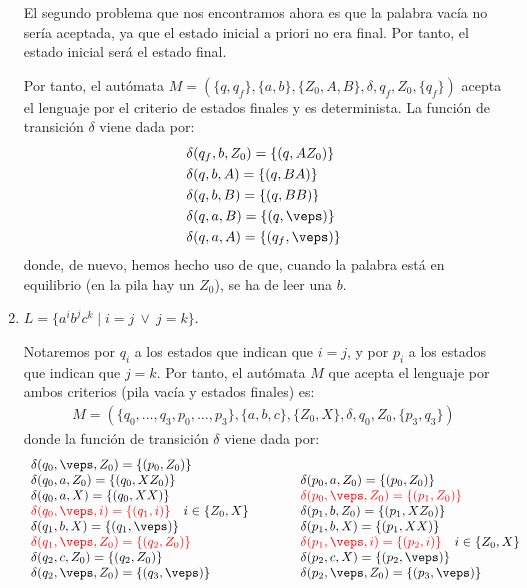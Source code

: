 \begin{ejercicio}
\begin{enumerate}
        El segundo problema que nos encontramos ahora es que la palabra vacía no sería aceptada, ya que el estado inicial a priori no era final. Por tanto, el estado inicial será el estado final.

        Por tanto, el autómata $M = (\{q, q_f\},\{a,b\},\{Z_0,A,B\},\delta,q_{f},Z_0,\{q_f\})$ acepta el lenguaje por el criterio de estados finales y es determinista. La función de transición $\delta$ viene dada por:
        \begin{align*}
            &\delta(q_{f},b,Z_0) = \{(q,AZ_0)\} \\
            &\delta(q,b,A) = \{(q,BA)\} \\
            &\delta(q,b,B) = \{(q,BB)\} \\
            &\delta(q,a,B) = \{(q,\veps)\} \\
            &\delta(q,a,A) = \{(q_f,\veps)\}
        \end{align*}
        donde, de nuevo, hemos hecho uso de que, cuando la palabra está en equilibrio (en la pila hay un $Z_0$), se ha de leer una $b$.
        \item $L = \{a^i b^j c^k \mid i=j\ \lor\ j = k\}$.
        
        Notaremos por $q_i$ a los estados que indican que $i=j$, y por $p_i$ a los estados que indican que $j=k$. Por tanto, el autómata $M$ que acepta el lenguaje por ambos criterios (pila vacía y estados finales) es:
        \begin{align*}
            M = (\{q_0,\dots,q_3,p_0,\dots,p_3\},\{a,b,c\},\{Z_0,X\},\delta,q_0,Z_0,\{p_3,q_3\})
        \end{align*}
        donde la función de transición $\delta$ viene dada por:
        \begin{equation*}
            \begin{array}{lcl}
                \delta(q_0,\veps,Z_0) = \{(p_0,Z_0)\} &\qquad &\\
                \delta(q_0,a,Z_0) = \{(q_0,XZ_0)\} &&\delta(p_0,a,Z_0) = \{(p_0,Z_0)\}\\
                \delta(q_0,a,X) = \{(q_0,XX)\} && \red{\delta(p_0,\veps,Z_0) = \{(p_1,Z_0)\}}\\
                \red{\delta(q_0,\veps,i) = \{(q_1,i)\}}~~~i\in \{Z_0,X\} && \delta(p_1,b,Z_0) = \{(p_1,XZ_0)\}\\
                \delta(q_1,b,X) = \{(q_1,\veps)\} && \delta(p_1,b,X) = \{(p_1,XX)\}\\
                \red{\delta(q_1,\veps,Z_0) = \{(q_2,Z_0)\}} && \red{\delta(p_1,\veps,i) = \{(p_2,i)\}}~~~i\in \{Z_0,X\}\\
                \delta(q_2,c,Z_0) = \{(q_2,Z_0)\} && \delta(p_2,c,X) = \{(p_2,\veps)\}\\
                \delta(q_2,\veps,Z_0) = \{(q_3,\veps)\} && \delta(p_2,\veps,Z_0) = \{(p_3,\veps)\}
            \end{array}
        \end{equation*}


\end{enumerate}
\end{ejercicio}
